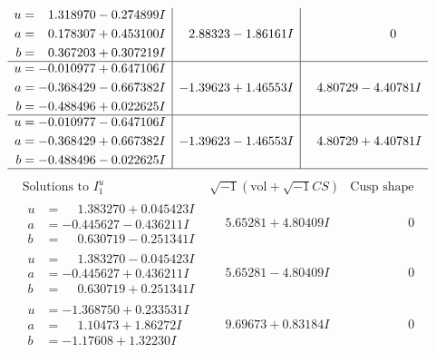 \documentclass[1p]{elsarticle_modified}
\theoremstyle{definition}
\newcommand{\I}{\sqrt{-1}}
\begin{document}
$$\begin{array}{c|c|c}
\begin{aligned}
u &= \phantom{-}1.318970 - 0.274899 I \\
a &= \phantom{-}0.178307 + 0.453100 I \\
b &= \phantom{-}0.367203 + 0.307219 I\end{aligned}
 & \phantom{-}2.88323 - 1.86161 I & \phantom{-0.000000 } 0 \\ \hline\begin{aligned}
u &= -0.010977 + 0.647106 I \\
a &= -0.368429 - 0.667382 I \\
b &= -0.488496 + 0.022625 I\end{aligned}
 & -1.39623 + 1.46553 I & \phantom{-}4.80729 - 4.40781 I \\ \hline\begin{aligned}
u &= -0.010977 - 0.647106 I \\
a &= -0.368429 + 0.667382 I \\
b &= -0.488496 - 0.022625 I\end{aligned}
 & -1.39623 - 1.46553 I & \phantom{-}4.80729 + 4.40781 I\\
 \hline 
 \end{array}$$\newpage$$\begin{array}{c|c|c}  
\text{Solutions to }I^u_{1}& \I (\text{vol} + \sqrt{-1}CS) & \text{Cusp shape}\\
 \hline 
\begin{aligned}
u &= \phantom{-}1.383270 + 0.045423 I \\
a &= -0.445627 - 0.436211 I \\
b &= \phantom{-}0.630719 - 0.251341 I\end{aligned}
 & \phantom{-}5.65281 + 4.80409 I & \phantom{-0.000000 } 0 \\ \hline\begin{aligned}
u &= \phantom{-}1.383270 - 0.045423 I \\
a &= -0.445627 + 0.436211 I \\
b &= \phantom{-}0.630719 + 0.251341 I\end{aligned}
 & \phantom{-}5.65281 - 4.80409 I & \phantom{-0.000000 } 0 \\ \hline\begin{aligned}
u &= -1.368750 + 0.233531 I \\
a &= \phantom{-}1.10473 + 1.86272 I \\
b &= -1.17608 + 1.32230 I\end{aligned}
 & \phantom{-}9.69673 + 0.83184 I & \phantom{-0.000000 } 0 \\ \hline\begin{aligned}

\end{aligned}
\end{array}$$
\end{document}
